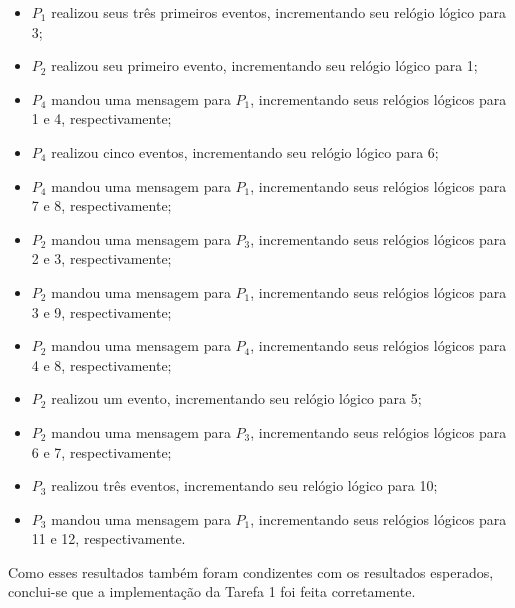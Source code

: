 \documentclass[conference]{IEEEtran}
\begin{document}
\begin{itemize}
\item $P_1$ realizou seus três primeiros eventos, incrementando seu relógio lógico para 3;
\item $P_2$ realizou seu primeiro evento, incrementando seu relógio lógico para 1;
\item $P_4$ mandou uma mensagem para $P_1$, incrementando seus relógios lógicos para 1 e 4, respectivamente;
\item $P_4$ realizou cinco eventos, incrementando seu relógio lógico para 6;
\item $P_4$ mandou uma mensagem para $P_1$, incrementando seus relógios lógicos para 7 e 8, respectivamente;
\item $P_2$ mandou uma mensagem para $P_3$, incrementando seus relógios lógicos para 2 e 3, respectivamente;
\item $P_2$ mandou uma mensagem para $P_1$, incrementando seus relógios lógicos para 3 e 9, respectivamente;
\item $P_2$ mandou uma mensagem para $P_4$, incrementando seus relógios lógicos para 4 e 8, respectivamente;
\item $P_2$ realizou um evento, incrementando seu relógio lógico para 5;
\item $P_2$ mandou uma mensagem para $P_3$, incrementando seus relógios lógicos para 6 e 7, respectivamente;
\item $P_3$ realizou três eventos, incrementando seu relógio lógico para 10;
\item $P_3$ mandou uma mensagem para $P_1$, incrementando seus relógios lógicos para 11 e 12, respectivamente.
\end{itemize}



	Como esses resultados também foram condizentes com os resultados esperados, conclui-se que a implementação da Tarefa 1 foi feita corretamente.
\end{document}

